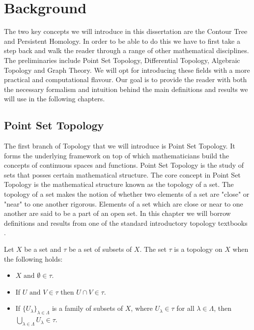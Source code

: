 \chapter{Background}
\label{chapter2}

The two key concepts we will introduce in this dissertation are the Contour Tree and Persistent Homology. In order to be able to do this we have to first take a step back and walk the reader through a range of other mathematical disciplines. The preliminaries include Point Set Topology, Differential Topology, Algebraic Topology and Graph Theory. We will opt for introducing these fields with a more practical and computational flavour. Our goal is to provide the reader with both the necessary formalism and intuition behind the main definitions and results we will use in the following chapters.

\section{Point Set Topology}

The first branch of Topology that we will introduce is Point Set Topology. It forms the underlying framework on top of which mathematicians build the concepts of continuous spaces and functions. Point Set Topology is the study of sets that posses certain mathematical structure. The core concept in Point Set Topology is the mathematical structure known as the topology of a set. The topology of a set makes the notion of whether two elements of a set are "close" or "near" to one another rigorous. Elements of a set which are close or near to one another are said to be a part of an open set.  In this chapter we will borrow definitions and results from one of the standard introductory topology textbooks \cite{intro-topo}.

\begin{defn} Let $X$ be a set and $\tau$ be a set of subsets of $X$. The set $\tau$ is a topology on $X$ when the following holds:  \end{defn}

\begin{itemize}
    \item $X \text{ and } \emptyset \in \tau$.
    \item If $U \text{ and } V \in \tau$ then $U \cap V \in \tau$.
    \item If $\{U_\lambda\}_{\lambda \in \Lambda}$ is a family of subsets of $X$, where $U_\lambda \in \tau$ for all $\lambda \in \Lambda$, then
        $\bigcup_{\lambda \in \Lambda}{U_\lambda} \in \tau$.
\end{itemize}

